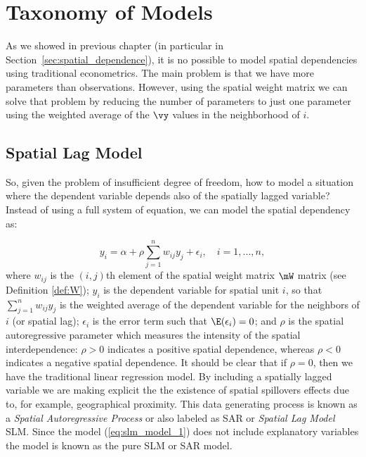 \documentclass[english,12pt]{book}\usepackage[]{graphicx}\usepackage[]{xcolor}
\begin{document}
\section{Taxonomy of Models}\label{sec:taxonomy}

As we showed in previous chapter (in particular in Section~\ref{sec:spatial_dependence}), it is no possible to model spatial dependencies using traditional econometrics. The main problem is that we have more parameters than observations. However, using the spatial weight matrix we can solve that problem by reducing the number of parameters to just one parameter using the weighted average of the $\vy$ values in the neighborhood of $i$. 

\subsection{Spatial Lag Model}

So, given the problem of insufficient degree of freedom, how to model a situation where the dependent variable depends also of the spatially lagged variable? Instead of using a full system of equation, we can model the spatial dependency as:

\begin{equation}\label{eq:slm_model_1}
y_i = \alpha +\rho \sum_{j = 1}^n w_{ij}y_j + \epsilon_i, \quad i = 1,...,n,
\end{equation}
%
where $w_{ij}$ is the $(i,j)$th element of the spatial weight matrix $\mW$ matrix (see Definition \ref{def:W}); $y_i$ is the dependent variable for spatial unit $i$, so that $\sum_{j = 1}^n w_{ij}y_j$ is the weighted average of the dependent variable for the neighbors of $i$ (or spatial lag); $\epsilon_i$ is the error term such that $\E(\epsilon_i)= 0$; and $\rho$ is the spatial autoregressive parameter which measures the intensity of the spatial interdependence: $\rho > 0$ indicates a positive spatial dependence, whereas $\rho < 0$ indicates a negative spatial dependence. It should be clear that if $\rho = 0$, then we have the traditional linear regression model. By including a spatially lagged variable we are making explicit the the existence of spatial spillovers effects due to, for example, geographical proximity. This data generating process is known as a \emph{Spatial Autoregressive Process} or also labeled as SAR or \emph{Spatial Lag Model} SLM. Since the model (\ref{eq:slm_model_1}) does not include explanatory variables the model is known as the pure SLM or SAR model. 
\end{document}
